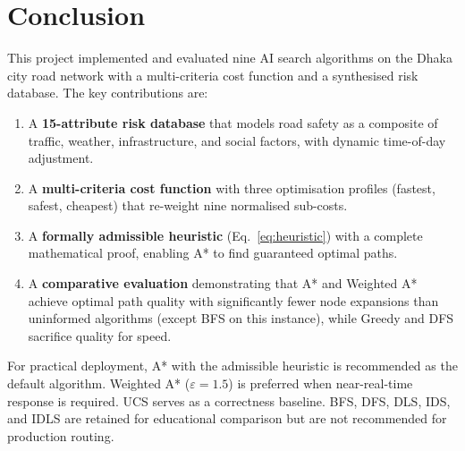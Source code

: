 ﻿\documentclass[a4paper, 12pt]{article}
\theoremstyle{remark}
\begin{document}
\section{Conclusion}

This project implemented and evaluated nine AI search algorithms on the Dhaka city road network with a multi-criteria cost function and a synthesised risk database. The key contributions are:

\begin{enumerate}
    \item A \textbf{15-attribute risk database} that models road safety as a composite of traffic, weather, infrastructure, and social factors, with dynamic time-of-day adjustment.
    \item A \textbf{multi-criteria cost function} with three optimisation profiles (fastest, safest, cheapest) that re-weight nine normalised sub-costs.
    \item A \textbf{formally admissible heuristic} (Eq.~\ref{eq:heuristic}) with a complete mathematical proof, enabling A* to find guaranteed optimal paths.
    \item A \textbf{comparative evaluation} demonstrating that A* and Weighted A* achieve optimal path quality with significantly fewer node expansions than uninformed algorithms (except BFS on this instance), while Greedy and DFS sacrifice quality for speed.
\end{enumerate}

For practical deployment, A* with the admissible heuristic is recommended as the default algorithm. Weighted A* ($\varepsilon = 1.5$) is preferred when near-real-time response is required. UCS serves as a correctness baseline. BFS, DFS, DLS, IDS, and IDLS are retained for educational comparison but are not recommended for production routing.
\end{document}
